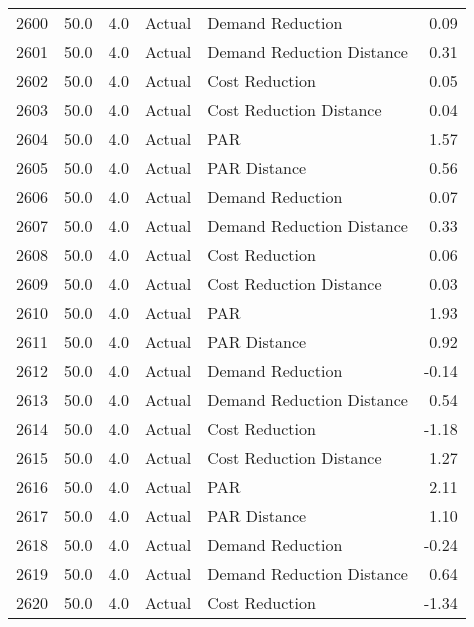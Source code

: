 \begin{longtable}{lrrllr}
2600 &         50.0 &     4.0 &         Actual &           Demand Reduction &   0.09 \\
2601 &         50.0 &     4.0 &         Actual &  Demand Reduction Distance &   0.31 \\
2602 &         50.0 &     4.0 &         Actual &             Cost Reduction &   0.05 \\
2603 &         50.0 &     4.0 &         Actual &    Cost Reduction Distance &   0.04 \\
2604 &         50.0 &     4.0 &         Actual &                        PAR &   1.57 \\
2605 &         50.0 &     4.0 &         Actual &               PAR Distance &   0.56 \\
2606 &         50.0 &     4.0 &         Actual &           Demand Reduction &   0.07 \\
2607 &         50.0 &     4.0 &         Actual &  Demand Reduction Distance &   0.33 \\
2608 &         50.0 &     4.0 &         Actual &             Cost Reduction &   0.06 \\
2609 &         50.0 &     4.0 &         Actual &    Cost Reduction Distance &   0.03 \\
2610 &         50.0 &     4.0 &         Actual &                        PAR &   1.93 \\
2611 &         50.0 &     4.0 &         Actual &               PAR Distance &   0.92 \\
2612 &         50.0 &     4.0 &         Actual &           Demand Reduction &  -0.14 \\
2613 &         50.0 &     4.0 &         Actual &  Demand Reduction Distance &   0.54 \\
2614 &         50.0 &     4.0 &         Actual &             Cost Reduction &  -1.18 \\
2615 &         50.0 &     4.0 &         Actual &    Cost Reduction Distance &   1.27 \\
2616 &         50.0 &     4.0 &         Actual &                        PAR &   2.11 \\
2617 &         50.0 &     4.0 &         Actual &               PAR Distance &   1.10 \\
2618 &         50.0 &     4.0 &         Actual &           Demand Reduction &  -0.24 \\
2619 &         50.0 &     4.0 &         Actual &  Demand Reduction Distance &   0.64 \\
2620 &         50.0 &     4.0 &         Actual &             Cost Reduction &  -1.34 \\

\end{longtable}
